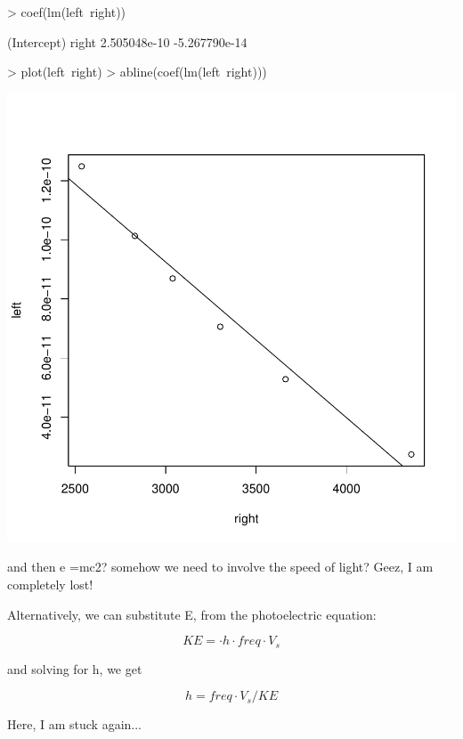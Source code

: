 \documentclass{article}
\begin{document}
\begin{Schunk}
\begin{Sinput}
> coef(lm(left~right))
\end{Sinput}
\begin{Soutput}
  (Intercept)         right 
 2.505048e-10 -5.267790e-14 
\end{Soutput}
\begin{Sinput}
> plot(left~right)
> abline(coef(lm(left~right)))
\end{Sinput}
\end{Schunk}
\includegraphics{Chemistry1-004}

and then e =mc2?  somehow we need to involve the speed of light? Geez, I am completely lost!



Alternatively, we can substitute E, from the photoelectric equation:

\begin{equation}
KE = \cdot h \cdot freq \cdot V_s
\end{equation}

and solving for h, we get

\begin{equation}
h = freq \cdot V_s /KE
\end{equation}

Here, I am stuck again...
\end{document}
